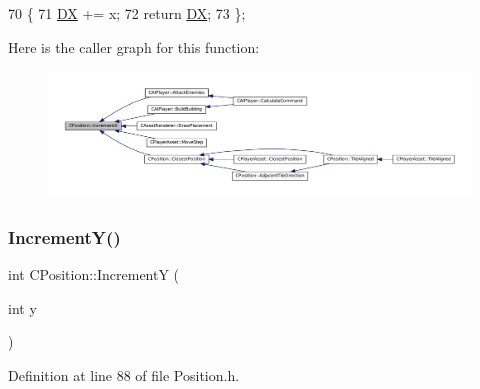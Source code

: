 \begin{DoxyCode}
70                              \{
71             \hyperlink{classCPosition_a28445f9b872169715919074d82044eda}{DX} += x; 
72             \textcolor{keywordflow}{return} \hyperlink{classCPosition_a28445f9b872169715919074d82044eda}{DX};
73         \};
\end{DoxyCode}
Here is the caller graph for this function\+:
\nopagebreak
\begin{figure}[H]
\begin{center}
\leavevmode
\includegraphics[width=350pt]{classCPosition_aa5955d67d5ab7ca74d80cb7303b6eaa9_icgraph}
\end{center}
\end{figure}
\hypertarget{classCPosition_a3f2a26798bb27b1252ff1be303b3adfc}{}\label{classCPosition_a3f2a26798bb27b1252ff1be303b3adfc} 
\subsubsection{\texorpdfstring{Increment\+Y()}{IncrementY()}}
{\footnotesize\ttfamily int C\+Position\+::\+IncrementY (\begin{DoxyParamCaption}\item[{int}]{y }\end{DoxyParamCaption})\hspace{0.3cm}{\ttfamily [inline]}}



Definition at line 88 of file Position.\+h.


